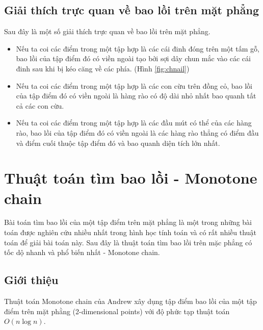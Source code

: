 \documentclass[12pt]{article}
\begin{document}
      \subsection{Giải thích trực quan về bao lồi trên mặt phẳng}
        Sau đây là một số giải thích trực quan về bao lồi trên mặt phẳng. 
        \begin{itemize}
          \item Nếu ta coi các điểm trong một tập hợp là các cái đinh đóng trên một tấm gỗ, bao lồi của tập điểm đó có viền ngoài tạo bởi sợi dây chun mắc vào các cái đinh sau khi bị kéo căng về các phía. (Hình \ref{fig:chnail})
          \item Nếu ta coi các điểm trong một tập hợp là các con cừu trên đồng cỏ, bao lồi của tập điểm đó có viền ngoài là hàng rào có độ dài nhỏ nhất bao quanh tất cả các con cừu.
          \item Nếu ta coi các điểm trong một tập hợp là các đầu mút có thể của các hàng rào, bao lồi của tập điểm đó có viền ngoài là các hàng rào thẳng có điểm đầu và điểm cuối thuộc tập điểm đó và bao quanh diện tích lớn nhất.
        \end{itemize}
    \section{Thuật toán tìm bao lồi - Monotone chain}
      Bài toán tìm bao lồi của một tập điểm trên mặt phẳng là một trong những bài toán được nghiên cứu nhiều nhất trong hình học tính toán và có rất nhiều thuật toán để giải bài toán này. Sau đây là thuật toán tìm bao lồi trên mặc phẳng có tốc dộ nhanh và phổ biến nhất - Monotone chain.
      \subsection{Giới thiệu}
        Thuật toán Monotone chain của Andrew xây dụng tập điểm bao lồi của một tập điểm trên mặt phằng (2-dimensional points) với độ phức tạp thuật toán $O(n\log n)$.
\end{document}
